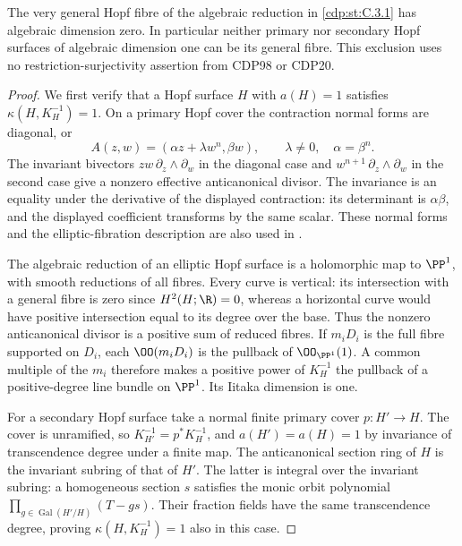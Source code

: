 
\begin{proposition}\label{cdp:st:C.3.8}

The very general Hopf fibre of the algebraic reduction in \ref{cdp:st:C.3.1}
has algebraic dimension zero. In particular neither primary nor
secondary Hopf surfaces of algebraic dimension one can be its
general fibre. This exclusion uses no restriction-surjectivity
assertion from CDP98 or CDP20.
\end{proposition}
\begin{proof}
We first verify that a Hopf surface $H$ with $a(H)=1$ satisfies
$\kappa(H,K_H^{-1})=1$. On a primary Hopf cover the contraction
normal forms are diagonal, or
\[
A(z,w)=(\alpha z+\lambda w^n,\beta w),\qquad
\lambda\ne0,\quad \alpha=\beta^n.
\]
The invariant bivectors $zw\,\partial_z\wedge\partial_w$ in the
diagonal case and $w^{n+1}\,\partial_z\wedge\partial_w$ in the
second case give a nonzero effective anticanonical divisor.
The invariance is an equality under the derivative of the
displayed contraction: its determinant is $\alpha\beta$, and
the displayed coefficient transforms by the same scalar.
These normal forms and the elliptic-fibration description are
also used in \cite[Proposition~3.1 and its proof]{SS2002}.

The algebraic reduction of an elliptic Hopf surface is a
holomorphic map to $\PP^1$, with smooth reductions of all fibres.
Every curve is vertical: its intersection with a general fibre
is zero since $H^2(H;\R)=0$, whereas a horizontal curve would
have positive intersection equal to its degree over the base.
Thus the nonzero anticanonical divisor is a positive sum of
reduced fibres. If $m_iD_i$ is the full fibre supported on
$D_i$, each $\OO(m_iD_i)$ is the pullback of $\OO_{\PP^1}(1)$.
A common multiple of the $m_i$ therefore makes a positive power
of $K_H^{-1}$ the pullback of a positive-degree line bundle on
$\PP^1$. Its Iitaka dimension is one.

For a secondary Hopf surface take a normal finite primary cover
$p:H'\to H$. The cover is unramified, so
$K_{H'}^{-1}=p^*K_H^{-1}$, and $a(H')=a(H)=1$ by invariance of
transcendence degree under a finite map. The anticanonical
section ring of $H$ is the invariant subring of that of $H'$.
The latter is integral over the invariant subring: a homogeneous
section $s$ satisfies the monic orbit polynomial
$\prod_{g\in\operatorname{Gal}(H'/H)}(T-gs)$. Their fraction
fields have the same transcendence degree, proving
$\kappa(H,K_H^{-1})=1$ also in this case.


\end{proof}
